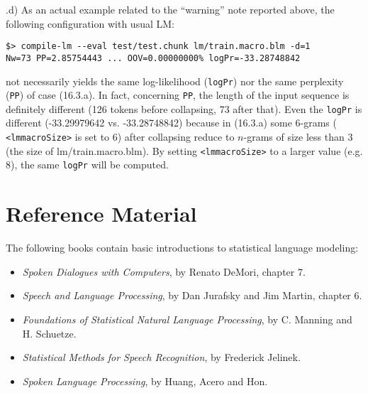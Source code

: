 \documentclass[11pt]{article}
\begin{document}
\bigskip
\noindent
\thesubsection.d) As an actual example related to the ``warning'' note
reported above, the following configuration with usual LM:

\begin{verbatim}
$> compile-lm --eval test/test.chunk lm/train.macro.blm -d=1
Nw=73 PP=2.85754443 ... OOV=0.00000000% logPr=-33.28748842
\end{verbatim}

\noindent not necessarily yields the same log-likelihood ({\tt logPr}) nor the same perplexity ({\tt PP}) of case (16.3.a).
In fact, concerning {\tt PP}, the length of the input sequence is definitely different (126 tokens before collapsing, 73 after that).
Even the {\tt logPr} is different (-33.29979642 vs. -33.28748842) because in (16.3.a) some 6-grams ({\tt
<lmmacroSize>} is set to 6) after collapsing reduce to $n$-grams of size less
than 3 (the size of lm/train.macro.blm). By setting {\tt <lmmacroSize>} to
a larger value (e.g. 8), the same {\tt logPr} will be computed.



\appendix


\newpage
\section{Reference Material}
The following books contain basic introductions to statistical language modeling:
\begin{itemize}
\item {\em Spoken Dialogues with Computers}, by Renato DeMori, chapter 7.
\item {\em Speech  and Language Processing},  by Dan  Jurafsky and  Jim Martin, chapter 6.
\item {\em Foundations   of  Statistical   Natural  Language   Processing},  by C. Manning and H. Schuetze.
\item {\em Statistical Methods for Speech Recognition}, by Frederick Jelinek.
\item {\em Spoken Language Processing}, by Huang, Acero and Hon.
\end{itemize}
\end{document}
